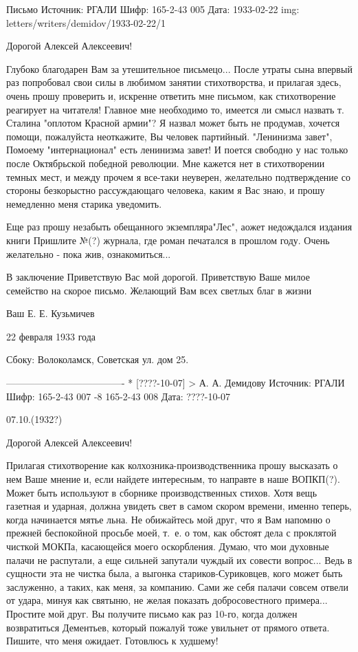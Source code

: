 \documentclass[]{memoir}
\begin{document}
Письмо
Источник: РГАЛИ
Шифр: 165-2-43 005
Дата: 1933-02-22
img: letters/writers/demidov/1933-02-22/1

Дорогой Алексей Алексеевич!

Глубоко благодарен Вам за утешительное письмецо... После утраты сына впервый раз попробовал свои силы в любимом занятии стихотворства, и прилагая здесь, очень прошу проверить и, искренне ответить мне письмом, как стихотворение реагирует на читателя! Главное мне необходимо то, имеется ли смысл назвать т. Сталина "оплотом Красной армии"? Я назвал может быть не продумав, хочется помощи, пожалуйста неоткажите, Вы человек партийный. "Ленинизма завет", Помоему "интернационал" есть ленинизма завет! И поется свободно у нас только после Октябрьской победной революции. Мне кажется нет в стихотворении темных мест, и между прочем я все-таки неуверен, желательно подтверждение со стороны безкорыстно рассуждающаго человека, каким я Вас знаю, и прошу немедленно меня старика уведомить.

Еще раз прошу незабыть обещанного экземпляра"Лес", аожет недождался издания книги Пришлите №(?) журнала, где роман печатался в прошлом году. Очень желательно - пока жив, ознакомиться...

В заключение Приветствую Вас мой дорогой. Приветствую Ваше милое семейство на скорое письмо. Желающий Вам всех светлых благ в жизни

Ваш Е. Е. Кузьмичев

22 февраля 1933 года

Сбоку: Волоколамск, Советская ул. дом 25.




-------------------------------------
* [????-10-07] > А. А. Демидову 
Источник: РГАЛИ
Шифр:   165-2-43 007 -8
        165-2-43 008
Дата: ????-10-07
                                                                       
07.10.(1932?)


                                                Дорогой 
                                      Алексей Алексеевич!

  Прилагая стихотворение как колхозника-производственника прошу высказать о нем Ваше мнение и, если найдете интересным, то направте в наше ВОПКП(?). Может быть используют в сборнике производственных стихов. Хотя вещь газетная и ударная, должна увидеть свет в самом скором времени, именно теперь, когда начинается мятье льна.
Не обижайтесь мой друг, что я Вам напомню о прежней беспокойной просьбе моей, т. е. о том, как обстоят дела с проклятой чисткой МОКПа, касающейся моего оскорбления.
Думаю, что мои духовные палачи не распутали, а еще сильней запутали чуждый их совести вопрос... Ведь в сущности эта не чистка была, а выгонка стариков-Суриковцев, кого может быть заслуженно, а таких, как меня, за компанию. Сами же себя палачи совсем отвели от удара, минуя как святыню, не желая показать добросовестного примера...
Простите мой друг. Вы получите письмо как раз 10-го, когда должен возвратиться Дементьев, который пожалуй тоже увильнет от прямого ответа. Пишите, что меня ожидает. Готовлюсь к худшему!
\end{document}
